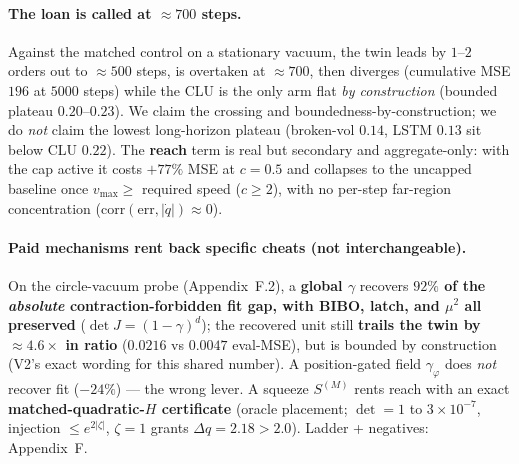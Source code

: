 \documentclass[11pt]{article}
\begin{document}
\paragraph{The loan is called at $\approx700$ steps.} Against the matched control on a stationary vacuum, the twin leads by $1$--$2$ orders out to $\approx500$ steps, is overtaken at $\approx700$, then diverges (cumulative MSE $196$ at $5000$ steps) while the CLU is the only arm flat \emph{by construction} (bounded plateau $0.20$--$0.23$). We claim the crossing and boundedness-by-construction; we do \emph{not} claim the lowest long-horizon plateau (broken-vol $0.14$, LSTM $0.13$ sit below CLU $0.22$). The \textbf{reach} term is real but secondary and aggregate-only: with the cap active it costs $+77\%$ MSE at $c=0.5$ and collapses to the uncapped baseline once $v_{\max}\ge$ required speed ($c\ge2$), with no per-step far-region concentration ($\mathrm{corr}(\text{err},|\dot q|)\approx0$).

\paragraph{Paid mechanisms rent back specific cheats (not interchangeable).} On the circle-vacuum probe (Appendix~F.2), a \textbf{global $\gamma$} recovers \textbf{$92\%$ of the \emph{absolute} contraction-forbidden fit gap, with BIBO, latch, and $\mu^2$ all preserved} ($\det J=(1-\gamma)^d$); the recovered unit still \textbf{trails the twin by $\approx4.6\times$ in ratio} ($0.0216$ vs $0.0047$ eval-MSE), but is bounded by construction (V2's exact wording for this shared number). A position-gated field $\gamma_\varphi$ does \emph{not} recover fit ($-24\%$) --- the wrong lever. A squeeze $S^{(M)}$ rents reach with an exact \textbf{matched-quadratic-$H$ certificate} (oracle placement; $\det=1$ to $3\times10^{-7}$, injection $\le e^{2|\zeta|}$, $\zeta=1$ grants $\Delta q=2.18>2.0$). Ladder + negatives: Appendix~F.
\end{document}

